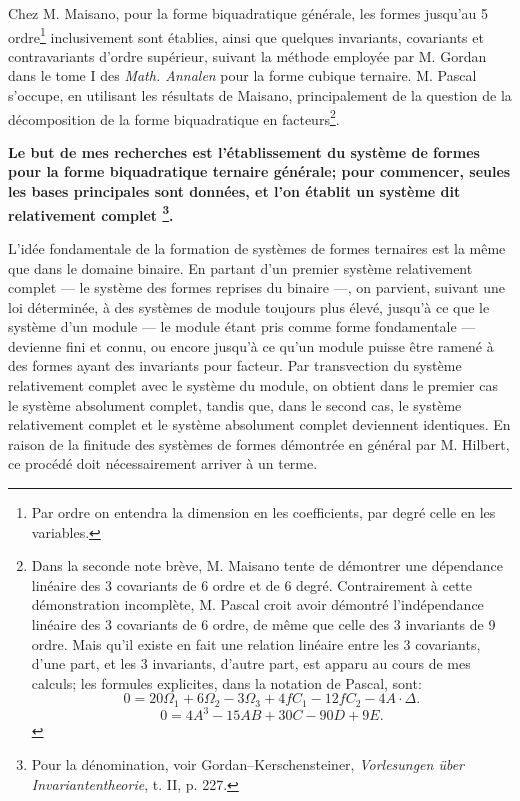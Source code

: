 \documentclass[11pt]{article}
\begin{document}
Chez M. Maisano, pour la forme biquadratique générale, les formes jusqu'au 5\ieme{} ordre\footnote{Par \og ordre \fg{} on entendra la dimension en les coefficients, par \og degré \fg{} celle en les variables.} inclusivement sont établies, ainsi que quelques invariants, covariants et contravariants d'ordre supérieur, suivant la méthode employée par M. Gordan dans le tome I des \emph{Math. Annalen} pour la forme cubique ternaire. M. Pascal s'occupe, en utilisant les résultats de Maisano, principalement de la question de la décomposition de la forme biquadratique en facteurs\footnote{Dans la seconde note brève, M. Maisano tente de démontrer une dépendance linéaire des 3 covariants de 6\ieme{} ordre et de 6\ieme{} degré. Contrairement à cette démonstration incomplète, M. Pascal croit avoir démontré l'indépendance linéaire des 3 covariants de 6\ieme{} ordre, de même que celle des 3 invariants de 9\ieme{} ordre. Mais qu'il existe en fait une relation linéaire entre les 3 covariants, d'une part, et les 3 invariants, d'autre part, est apparu au cours de mes calculs; les formules explicites, dans la notation de Pascal, sont:
\[
0=20\Omega_1+6\Omega_2-3\Omega_3+4fC_1-12fC_2-4A\cdot\Delta.
\]
\[
0=4A^3-15AB+30C-90D+9E.
\]}. 

\textbf{Le but de mes recherches est l'établissement du système de formes pour la forme biquadratique ternaire générale; pour commencer, seules les bases principales sont données, et l'on établit un système dit \og relativement complet \fg{}\footnote{Pour la dénomination, voir Gordan--Kerschensteiner, \emph{Vorlesungen über Invariantentheorie}, t. II, p. 227.}.}

L'idée fondamentale de la formation de systèmes de formes ternaires est la même que dans le domaine binaire. En partant d'un premier système relativement complet --- le système des formes reprises du binaire ---, on parvient, suivant une loi déterminée, à des systèmes de module toujours plus élevé, jusqu'à ce que le système d'un module --- le module étant pris comme forme fondamentale --- devienne fini et connu, ou encore jusqu'à ce qu'un module puisse être ramené à des formes ayant des invariants pour facteur. Par transvection du système relativement complet avec le système du module, on obtient dans le premier cas le système absolument complet, tandis que, dans le second cas, le système relativement complet et le système absolument complet deviennent identiques. En raison de la finitude des systèmes de formes démontrée en général par M. Hilbert, ce procédé doit nécessairement arriver à un terme.
\end{document}
